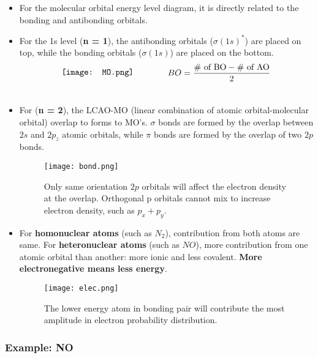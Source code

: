 \documentclass[12pt, letterpaper, twoside]{article}
\begin{document}
\begin{itemize}
    \item For the molecular orbital energy level diagram, it is directly related to the bonding and antibonding orbitals.
    \item For the 1s level (\textbf{n = 1}), the antibonding orbitals ($\sigma(1s)^*$) are placed on top, while the bonding orbitals ($\sigma(1s)$) are placed on the bottom.
    \begin{align}
    \vcenter{\hbox{\texttt{[image: MO.png]}}}
        &\qquad\qquad
        \begin{aligned}
            BO = \frac{\# \text{ of BO} - \# \text{ of AO}}{2}
        \end{aligned}\\
        \vcenter{\hbox{\begin{minipage}{10cm}
        \end{minipage}}}
        & \notag
    \end{align}
    \item For (\textbf{n = 2}), the LCAO-MO (linear combination of atomic orbital-molecular orbital) overlap to forms to MO's. $\sigma$ bonds are formed by the overlap between $2s$ and $2p_z$ atomic orbitals, while $\pi$ bonds are formed by the overlap of two $2p$ bonds.
    \begin{figure}[!ht]
        \centering
        \texttt{[image: bond.png]}
        \caption{Only same orientation $2p$ orbitals will affect the electron density at the overlap. Orthogonal p orbitals cannot mix to increase electron density, such as $p_x + p_y$.}
        \label{fig:my_label}
    \end{figure}
    \item For \textbf{homonuclear atoms} (such as $N_2$), contribution from both atoms are same. For \textbf{heteronuclear atoms} (such as $NO$), more contribution from one atomic orbital than another: more ionic and less covalent. \textbf{More electronegative means less energy}.
    \begin{figure}[!ht]
        \centering
        \texttt{[image: elec.png]}
        \caption{The lower energy atom in bonding pair will contribute the most amplitude in electron probability distribution.}
    \end{figure}
\end{itemize}

\subsubsection{Example: NO}
\end{document}
